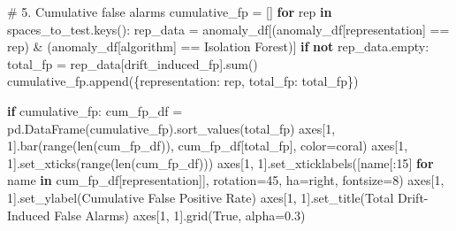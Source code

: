 \documentclass[
  letterpaper,
  DIV=11,
  numbers=noendperiod]{scrartcl}
\newenvironment{Shaded}{\begin{snugshade}}{\end{snugshade}}
\newcommand{\BuiltInTok}[1]{\textcolor[rgb]{0.00,0.23,0.31}{#1}}
\newcommand{\CommentTok}[1]{\textcolor[rgb]{0.37,0.37,0.37}{#1}}
\newcommand{\ControlFlowTok}[1]{\textcolor[rgb]{0.00,0.23,0.31}{\textbf{#1}}}
\newcommand{\DecValTok}[1]{\textcolor[rgb]{0.68,0.00,0.00}{#1}}
\newcommand{\FloatTok}[1]{\textcolor[rgb]{0.68,0.00,0.00}{#1}}
\newcommand{\KeywordTok}[1]{\textcolor[rgb]{0.00,0.23,0.31}{\textbf{#1}}}
\newcommand{\NormalTok}[1]{\textcolor[rgb]{0.00,0.23,0.31}{#1}}
\newcommand{\OperatorTok}[1]{\textcolor[rgb]{0.37,0.37,0.37}{#1}}
\newcommand{\StringTok}[1]{\textcolor[rgb]{0.13,0.47,0.30}{#1}}
\newcommand{\VariableTok}[1]{\textcolor[rgb]{0.07,0.07,0.07}{#1}}
\renewenvironment{Shaded}{%
  \begin{tcolorbox}[%
    enhanced,%
    colback=codebg,%
    colframe=codebg,%
    borderline west={3pt}{0pt}{sectionblue},%
    fontupper=\small\ttfamily,%
    boxrule=0pt,%
    arc=0pt,%
    boxsep=5pt,%
    left=2mm,%
    right=2mm,%
    top=2mm,%
    bottom=2mm%
  ]%
}{%
  \end{tcolorbox}%
}
\begin{document}
\begin{Shaded}
\begin{Highlighting}[]
\CommentTok{\# 5. Cumulative false alarms}
\NormalTok{cumulative\_fp }\OperatorTok{=}\NormalTok{ []}
\ControlFlowTok{for}\NormalTok{ rep }\KeywordTok{in}\NormalTok{ spaces\_to\_test.keys():}
\NormalTok{    rep\_data }\OperatorTok{=}\NormalTok{ anomaly\_df[(anomaly\_df[}\StringTok{\textquotesingle{}representation\textquotesingle{}}\NormalTok{] }\OperatorTok{==}\NormalTok{ rep) }\OperatorTok{\&} 
\NormalTok{                          (anomaly\_df[}\StringTok{\textquotesingle{}algorithm\textquotesingle{}}\NormalTok{] }\OperatorTok{==} \StringTok{\textquotesingle{}Isolation Forest\textquotesingle{}}\NormalTok{)]}
    \ControlFlowTok{if} \KeywordTok{not}\NormalTok{ rep\_data.empty:}
\NormalTok{        total\_fp }\OperatorTok{=}\NormalTok{ rep\_data[}\StringTok{\textquotesingle{}drift\_induced\_fp\textquotesingle{}}\NormalTok{].}\BuiltInTok{sum}\NormalTok{()}
\NormalTok{        cumulative\_fp.append(\{}\StringTok{\textquotesingle{}representation\textquotesingle{}}\NormalTok{: rep, }\StringTok{\textquotesingle{}total\_fp\textquotesingle{}}\NormalTok{: total\_fp\})}

\ControlFlowTok{if}\NormalTok{ cumulative\_fp:}
\NormalTok{    cum\_fp\_df }\OperatorTok{=}\NormalTok{ pd.DataFrame(cumulative\_fp).sort\_values(}\StringTok{\textquotesingle{}total\_fp\textquotesingle{}}\NormalTok{)}
\NormalTok{    axes[}\DecValTok{1}\NormalTok{, }\DecValTok{1}\NormalTok{].bar(}\BuiltInTok{range}\NormalTok{(}\BuiltInTok{len}\NormalTok{(cum\_fp\_df)), cum\_fp\_df[}\StringTok{\textquotesingle{}total\_fp\textquotesingle{}}\NormalTok{], color}\OperatorTok{=}\StringTok{\textquotesingle{}coral\textquotesingle{}}\NormalTok{)}
\NormalTok{    axes[}\DecValTok{1}\NormalTok{, }\DecValTok{1}\NormalTok{].set\_xticks(}\BuiltInTok{range}\NormalTok{(}\BuiltInTok{len}\NormalTok{(cum\_fp\_df)))}
\NormalTok{    axes[}\DecValTok{1}\NormalTok{, }\DecValTok{1}\NormalTok{].set\_xticklabels([name[:}\DecValTok{15}\NormalTok{] }\ControlFlowTok{for}\NormalTok{ name }\KeywordTok{in}\NormalTok{ cum\_fp\_df[}\StringTok{\textquotesingle{}representation\textquotesingle{}}\NormalTok{]], }
\NormalTok{                               rotation}\OperatorTok{=}\DecValTok{45}\NormalTok{, ha}\OperatorTok{=}\StringTok{\textquotesingle{}right\textquotesingle{}}\NormalTok{, fontsize}\OperatorTok{=}\DecValTok{8}\NormalTok{)}
\NormalTok{    axes[}\DecValTok{1}\NormalTok{, }\DecValTok{1}\NormalTok{].set\_ylabel(}\StringTok{\textquotesingle{}Cumulative False Positive Rate\textquotesingle{}}\NormalTok{)}
\NormalTok{    axes[}\DecValTok{1}\NormalTok{, }\DecValTok{1}\NormalTok{].set\_title(}\StringTok{\textquotesingle{}Total Drift{-}Induced False Alarms\textquotesingle{}}\NormalTok{)}
\NormalTok{    axes[}\DecValTok{1}\NormalTok{, }\DecValTok{1}\NormalTok{].grid(}\VariableTok{True}\NormalTok{, alpha}\OperatorTok{=}\FloatTok{0.3}\NormalTok{)}


\end{Highlighting}
\end{Shaded}
\end{document}
